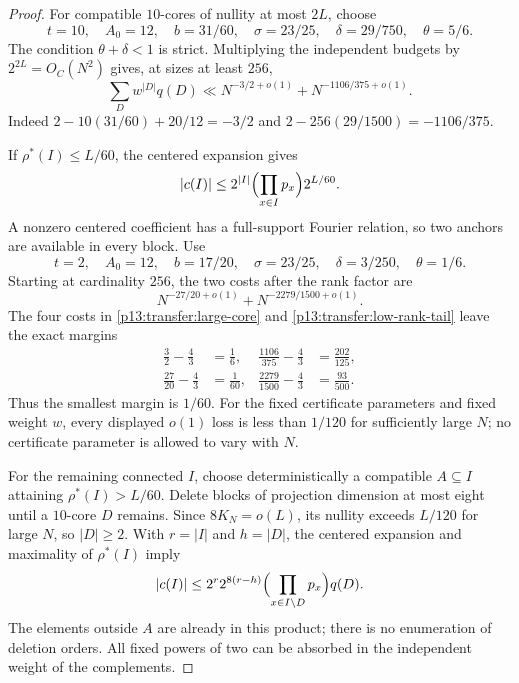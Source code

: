 \begin{proof}
For compatible $10$-cores of nullity at most $2L$, choose
\[
 t=10,\quad A_0=12,\quad b=31/60,\quad
 \sigma=23/25,\quad\delta=29/750,\quad\theta=5/6.
\]
The condition $\theta+\delta<1$ is strict. Multiplying the independent
budgets by $2^{2L}=O_C(N^2)$ gives, at sizes at least $256$,
\begin{equation}
 \sum_D w^{|D|}q(D)
 \ll N^{-3/2+o(1)}+N^{-1106/375+o(1)}.
 \label{p13:transfer:large-core}
\end{equation}
Indeed $2-10(31/60)+20/12=-3/2$ and
$2-256(29/1500)=-1106/375$.

If $\rho^*(I)\leq L/60$, the centered expansion gives
\[
 |c(I)|\leq2^{|I|}\Bigl(\prod_{x\in I}p_x\Bigr)2^{L/60}.
\]
A nonzero centered coefficient has a full-support Fourier relation,
so two anchors are available in every block. Use
\[
 t=2,\quad A_0=12,\quad b=17/20,\quad
 \sigma=23/25,\quad\delta=3/250,\quad\theta=1/6.
\]
Starting at cardinality $256$, the two costs after the rank factor are
\begin{equation}
 N^{-27/20+o(1)}+N^{-2279/1500+o(1)}.
 \label{p13:transfer:low-rank-tail}
\end{equation}
The four costs in \eqref{p13:transfer:large-core} and
\eqref{p13:transfer:low-rank-tail} leave the exact margins
\[
 \begin{aligned}
 \frac32-\frac43&=\frac16,&
 \frac{1106}{375}-\frac43&=\frac{202}{125},\\
 \frac{27}{20}-\frac43&=\frac1{60},&
 \frac{2279}{1500}-\frac43&=\frac{93}{500}.
 \end{aligned}
\]
Thus the smallest margin is $1/60$. For the fixed certificate parameters
and fixed weight $w$, every displayed $o(1)$ loss is less than $1/120$
for sufficiently large $N$; no certificate parameter is allowed to vary
with $N$.

For the remaining connected $I$, choose deterministically a compatible
$A\subseteq I$ attaining $\rho^*(I)>L/60$. Delete blocks of projection
dimension at most eight until a $10$-core $D$ remains. Since
$8K_N=o(L)$, its nullity exceeds $L/120$ for large $N$, so $|D|\geq2$.
With $r=|I|$ and $h=|D|$, the centered expansion and maximality of
$\rho^*(I)$ imply
\begin{equation}
 |c(I)|\leq2^r2^{8(r-h)}
               \Bigl(\prod_{x\in I\setminus D}p_x\Bigr)q(D).
 \label{p13:transfer:peeling}
\end{equation}
The elements outside $A$ are already in this product; there is no
enumeration of deletion orders. All fixed powers of two can be absorbed
in the independent weight of the complements.


\end{proof}
